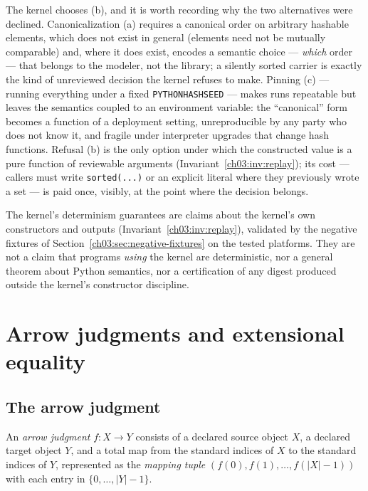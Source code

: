 The kernel chooses (b), and it is worth recording why the two alternatives
were declined. Canonicalization (a) requires a canonical order on
arbitrary hashable elements, which does not exist in general (elements
need not be mutually comparable) and, where it does exist, encodes a
semantic choice --- \emph{which} order --- that belongs to the modeler, not
the library; a silently sorted carrier is exactly the kind of unreviewed
decision the kernel refuses to make. Pinning (c) --- running everything
under a fixed \texttt{PYTHONHASHSEED} --- makes runs repeatable but leaves
the semantics coupled to an environment variable: the ``canonical'' form
becomes a function of a deployment setting, unreproducible by any party
who does not know it, and fragile under interpreter upgrades that change
hash functions. Refusal (b) is the only option under which the constructed
value is a pure function of reviewable arguments
(Invariant~\ref{ch03:inv:replay}); its cost --- callers must write
\texttt{sorted(...)} or an explicit literal where they previously wrote a
set --- is paid once, visibly, at the point where the decision belongs.

\begin{boundary}\label{ch03:boundary:evidence}
The kernel's determinism guarantees are claims about the kernel's own
constructors and outputs (Invariant~\ref{ch03:inv:replay}), validated by
the negative fixtures of Section~\ref{ch03:sec:negative-fixtures} on the
tested platforms. They are not a claim that programs \emph{using} the
kernel are deterministic, nor a general theorem about Python semantics,
nor a certification of any digest produced outside the kernel's
constructor discipline.
\end{boundary}

\section{Arrow judgments and extensional equality}\label{ch03:sec:arrows}

\subsection{The arrow judgment}

\begin{definition}[Arrow]\label{ch03:def:arrow}
An \emph{arrow judgment} $f : X \to Y$ consists of a declared source
object $X$, a declared target object $Y$, and a total map from the
standard indices of $X$ to the standard indices of $Y$, represented as the
\emph{mapping tuple} $(f(0), f(1), \dots, f(|X|-1))$ with each entry in
$\{0, \dots, |Y|-1\}$.
\end{definition}

